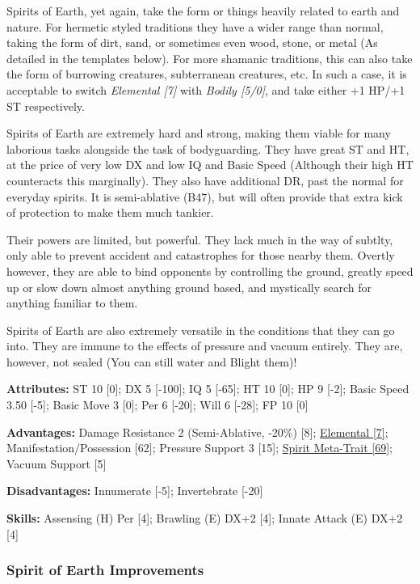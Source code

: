 \begin{multicols}{3}
	Spirits of Earth, yet again, take the form or things heavily related to earth and nature. For hermetic styled traditions they have a wider range than normal, taking the form of dirt, sand, or sometimes even wood, stone, or metal (As detailed in the templates below). For more shamanic traditions, this can also take the form of burrowing creatures, subterranean creatures, etc. In such a case, it is acceptable to switch \textit{Elemental [7]} with \textit{Bodily [5/0]}, and take either +1 HP/+1 ST respectively.
	
	Spirits of Earth are extremely hard and strong, making them viable for many laborious tasks alongside the task of bodyguarding. They have great ST and HT, at the price of very low DX and low IQ and Basic Speed (Although their high HT counteracts this marginally). They also have additional DR, past the normal for everyday spirits. It is semi-ablative (B47), but will often provide that extra kick of protection to make them much tankier.
	
	Their powers are limited, but powerful. They lack much in the way of subtlty, only able to prevent accident and catastrophes for those nearby them. Overtly however, they are able to bind opponents by controlling the ground, greatly speed up or slow down almost anything ground based, and mystically search for anything familiar to them.
	
	Spirits of Earth are also extremely versatile in the conditions that they can go into. They are immune to the effects of pressure and vacuum entirely. They are, however, not sealed (You can still water and Blight them)!
	
	\textbf{Attributes:}
	ST 10 [0]; DX 5 [-100]; IQ 5 [-65]; HT 10 [0]; HP 9 [-2]; Basic Speed 3.50 [-5]; Basic Move 3 [0]; Per 6 [-20]; Will 6 [-28]; FP 10 [0]
	
	\textbf{Advantages:}
	Damage Resistance 2 (Semi-Ablative, -20\%) [8]; \hyperref[elemental]{Elemental [7]}; Manifestation/Possession [62]; Pressure Support 3 [15]; \hyperref[spirit_meta_trait]{Spirit Meta-Trait [69]}; Vacuum Support [5]
	
	\textbf{Disadvantages:}
	Innumerate [-5]; Invertebrate [-20]
	
	\textbf{Skills:}
	Assensing (H) Per [4]; Brawling (E) DX+2 [4]; Innate Attack (E) DX+2 [4]
	
	\subsubsection*{Spirit of Earth Improvements}
	

\end{multicols}
